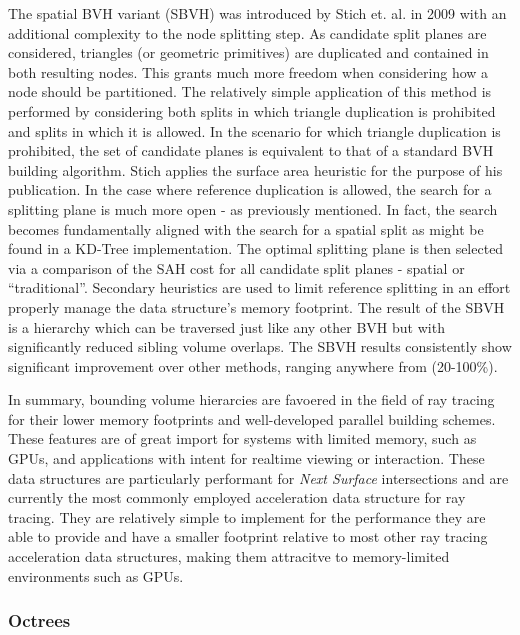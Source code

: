 The spatial BVH variant (SBVH) was introduced by Stich et. al. in 2009
\cite{Stich_2009} with an additional complexity to the node splitting step. As
candidate split planes are considered, triangles (or
geometric primitives) are duplicated and contained in both resulting nodes. This grants much
more freedom when considering how a node should be partitioned. The relatively simple application of this
method is performed by considering both splits in which triangle duplication is
prohibited and splits in which it is allowed. In the scenario for which triangle
duplication is prohibited, the set of candidate planes is equivalent to that of
a standard BVH building algorithm. Stich applies the surface area heuristic for
the purpose of his publication. In the case where reference duplication is
allowed, the search for a splitting plane is much more open - as previously
mentioned. In fact, the search becomes fundamentally aligned with the search for
a spatial split as might be found in a KD-Tree implementation. The optimal
splitting plane is then selected via a comparison of the SAH cost for all
candidate split planes - spatial or ``traditional''. Secondary heuristics are used
to limit reference splitting in an effort properly manage the data structure's
memory footprint. The result of the SBVH is a hierarchy which can be traversed
just like any other BVH but with significantly reduced sibling volume
overlaps. The SBVH results consistently show significant improvement over other
methods, ranging anywhere from (20-100\%).\cite{Stich_2009}

In summary, bounding volume hierarcies are favoered in the field of ray tracing
for their lower memory footprints and well-developed parallel building
schemes. These features are of great import for systems with limited memory,
such as GPUs, and applications with intent for realtime viewing or
interaction. These data structures are particularly performant for \textit{Next
  Surface} intersections and are currently the most commonly employed
acceleration data structure for ray tracing. They are relatively simple to
implement for the performance they are able to provide and have a smaller
footprint relative to most other ray tracing acceleration data structures,
making them attracitve to memory-limited environments such as GPUs.

\subsubsection{Octrees}%
\label{subsec:octree}


